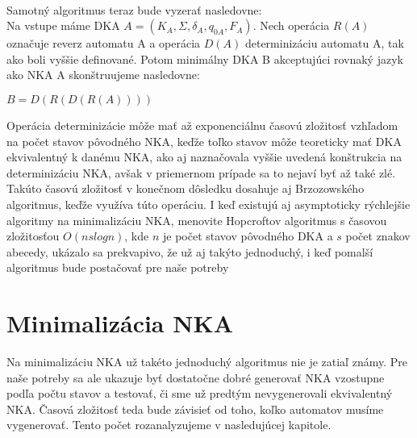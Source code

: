 \paragraph{}
Samotný algoritmus teraz bude vyzerať nasledovne:\\
Na vstupe máme DKA $A=(K_A,\Sigma,\delta_A,q_{0A},F_A)$. Nech operácia $R(A)$ označuje reverz automatu A a operácia $D(A)$ determinizáciu automatu A, tak ako boli vyššie definované. Potom minimálny DKA B akceptujúci rovnaký jazyk ako NKA A skonštruujeme nasledovne:
\\
\centerline{$B=D(R(D(R(A))))$}
Operácia determinizácie môže mať až exponenciálnu časovú zložitosť vzhľadom na počet stavov pôvodného NKA, keďže toľko stavov môže teoreticky mať DKA ekvivalentný k danému NKA, ako aj naznačovala vyššie uvedená konštrukcia na determinizáciu NKA, avšak v priemernom prípade sa to nejaví byť až také zlé. Takúto časovú zložitosť v konečnom dôsledku dosahuje aj Brzozowského algoritmus, keďže využíva túto operáciu. I keď existujú aj asymptoticky rýchlejšie algoritmy na minimalizáciu NKA, menovite Hopcroftov algoritmus s časovou zložitosťou $O(nslog n)$, kde $n$ je počet stavov pôvodného DKA a $s$ počet znakov abecedy, ukázalo sa prekvapivo, že už aj takýto jednoduchý, i keď pomalší algoritmus bude postačovať pre naše potreby

\section{Minimalizácia NKA}

Na minimalizáciu NKA už takéto jednoduchý algoritmus nie je zatiaľ známy. Pre naše potreby sa ale ukazuje byť dostatočne dobré generovať NKA vzostupne podľa počtu stavov a testovať, či sme už predtým nevygenerovali ekvivalentný NKA. Časová zložitosť teda bude závisieť od toho, koľko automatov musíme vygenerovať. Tento počet rozanalyzujeme v nasledujúcej kapitole.

